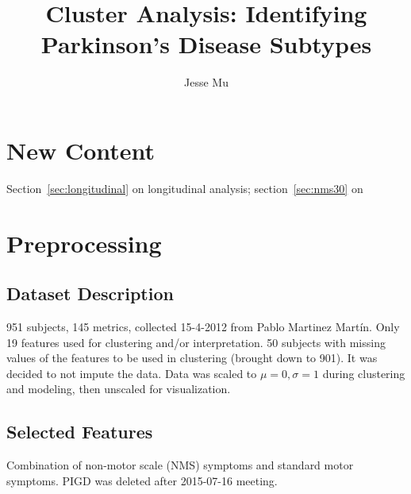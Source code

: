 \documentclass[10pt]{article}
\begin{document}
\title{Cluster Analysis: Identifying Parkinson's Disease Subtypes}
\author{Jesse Mu}
\maketitle

\tableofcontents
\newpage

\begin{multicols}{2}

\section{New Content}

Section~\ref{sec:longitudinal} on longitudinal analysis; section~\ref{sec:nms30} on

\section{Preprocessing}

\subsection{Dataset Description}
951 subjects, 145 metrics, collected 15-4-2012 from Pablo Martinez Mart\'in. Only
19 features used for clustering and/or interpretation.  50 subjects with
missing values of the features to be used in clustering (brought down to 901).
It was decided to not impute the data. Data was scaled to $\mu = 0, \sigma =
1$ during clustering and modeling, then unscaled for visualization.

\subsection{Selected Features}

Combination of non-motor scale (NMS) symptoms and standard motor symptoms.
PIGD was deleted after 2015-07-16 meeting.


\end{multicols}
\end{document}
